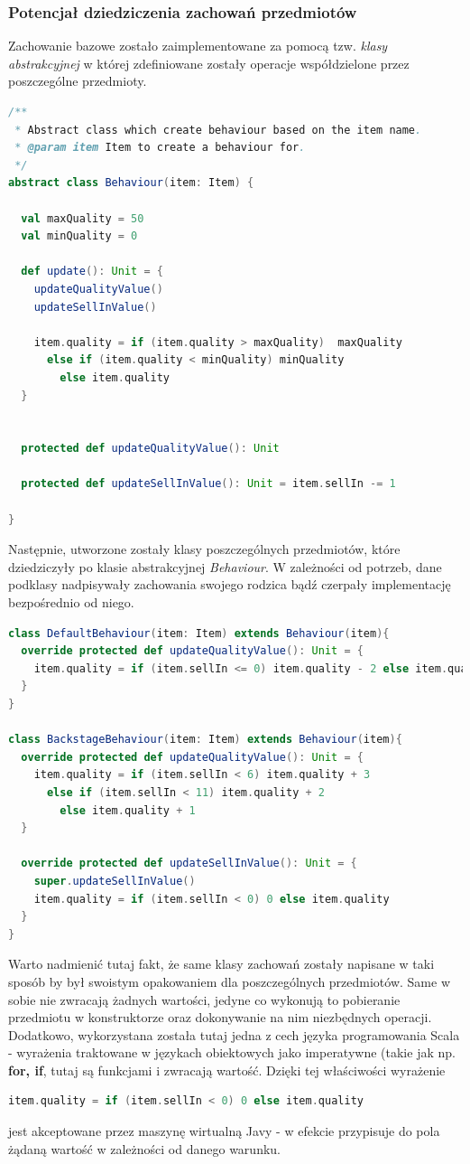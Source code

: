 \documentclass[a4paper, 11pt]{article}
\begin{document}
\subsubsection{Potencjał dziedziczenia zachowań przedmiotów}
Zachowanie bazowe zostało zaimplementowane za pomocą tzw. \textit{klasy abstrakcyjnej} w której zdefiniowane zostały operacje współdzielone przez poszczególne przedmioty.
\begin{lstlisting}[language=scala]
 /**
 * Abstract class which create behaviour based on the item name.
 * @param item Item to create a behaviour for.
 */
abstract class Behaviour(item: Item) {

  val maxQuality = 50
  val minQuality = 0

  def update(): Unit = {
    updateQualityValue()
    updateSellInValue()

    item.quality = if (item.quality > maxQuality)  maxQuality
      else if (item.quality < minQuality) minQuality
        else item.quality
  }


  protected def updateQualityValue(): Unit

  protected def updateSellInValue(): Unit = item.sellIn -= 1

}
\end{lstlisting}
Następnie, utworzone zostały klasy poszczególnych przedmiotów, które dziedziczyły po klasie abstrakcyjnej \textit{Behaviour}. W zależności od potrzeb, dane podklasy nadpisywały zachowania swojego rodzica bądź czerpały implementację bezpośrednio od niego.
\begin{lstlisting}[language=scala]
 class DefaultBehaviour(item: Item) extends Behaviour(item){
  override protected def updateQualityValue(): Unit = {
    item.quality = if (item.sellIn <= 0) item.quality - 2 else item.quality - 1
  }
}

class BackstageBehaviour(item: Item) extends Behaviour(item){
  override protected def updateQualityValue(): Unit = {
    item.quality = if (item.sellIn < 6) item.quality + 3
      else if (item.sellIn < 11) item.quality + 2
        else item.quality + 1
  }

  override protected def updateSellInValue(): Unit = {
    super.updateSellInValue()
    item.quality = if (item.sellIn < 0) 0 else item.quality
  }
}
\end{lstlisting}
Warto nadmienić tutaj fakt, że same klasy zachowań zostały napisane w taki sposób by był swoistym opakowaniem dla poszczególnych przedmiotów. Same w sobie nie zwracają żadnych wartości, jedyne co wykonują to pobieranie przedmiotu w konstruktorze oraz dokonywanie na nim niezbędnych operacji. Dodatkowo, wykorzystana została tutaj jedna z cech języka programowania Scala - wyrażenia traktowane w językach obiektowych jako imperatywne (takie jak np. \textbf{for, if}, tutaj są funkcjami i zwracają wartość. Dzięki tej właściwości wyrażenie
\begin{lstlisting}[language=scala]
item.quality = if (item.sellIn < 0) 0 else item.quality
\end{lstlisting}
jest akceptowane przez maszynę wirtualną Javy - w efekcie przypisuje do pola żądaną wartość w zależności od danego warunku.
\end{document}
